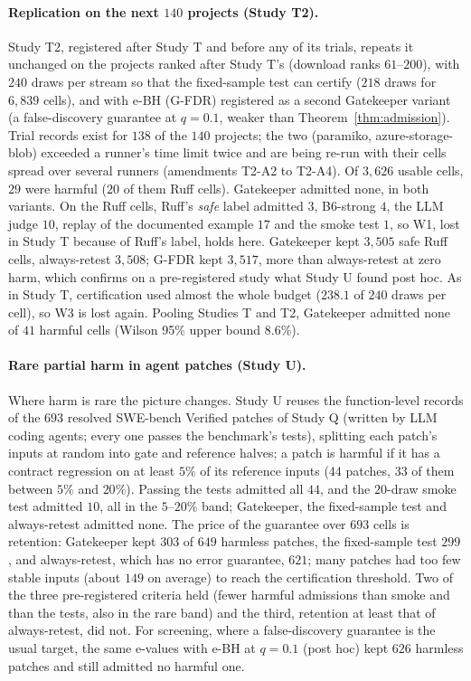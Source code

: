 \paragraph{Replication on the next $140$ projects (Study T2).}
Study T2, registered after Study T and before any of its trials, repeats it unchanged on the projects ranked after Study T's
(download ranks $61$--$200$), with $240$ draws per stream so that the fixed-sample test can certify ($218$ draws for $6{,}839$
cells), and with e-BH (G-FDR) registered as a second Gatekeeper variant (a false-discovery guarantee at $q=0.1$, weaker than Theorem~\ref{thm:admission}).  Trial records exist for $138$ of the $140$ projects; the
two (paramiko, azure-storage-blob) exceeded a runner's time limit twice and are being re-run with their cells spread over several runners (amendments T2-A2 to T2-A4).  Of
$3{,}626$ usable cells, $29$ were harmful ($20$ of them Ruff cells). Gatekeeper admitted none, in both variants.  On the Ruff cells,
Ruff's \emph{safe} label admitted $3$, B6-strong $4$, the LLM judge $10$, replay of the documented example $17$ and the smoke test
$1$, so W1, lost in Study T because of Ruff's label, holds here.  Gatekeeper kept $3{,}505$ safe Ruff cells, always-retest $3{,}508$; G-FDR kept $3{,}517$, more than always-retest at zero harm, which confirms on a pre-registered study what Study U found post hoc.
As in Study T, certification used almost the whole budget ($238.1$ of $240$ draws per cell), so W3 is lost again.
Pooling Studies T and T2, Gatekeeper admitted none of $41$ harmful cells (Wilson 95\% upper bound $8.6\%$).

\paragraph{Rare partial harm in agent patches (Study U).}
Where harm is rare the picture changes.  Study U reuses the function-level records of the $693$ resolved SWE-bench Verified
patches of Study Q (written by LLM coding agents; every one passes the benchmark's tests), splitting each patch's inputs at random
into gate and reference halves; a patch is harmful if it has a contract regression on at least $5\%$ of its reference inputs
($44$ patches, $33$ of them between $5\%$ and $20\%$).  Passing the tests admitted all $44$, and the $20$-draw smoke test admitted $10$, all
in the $5$--$20\%$ band; Gatekeeper, the fixed-sample test and always-retest admitted none.  The price of the guarantee over $693$
cells is retention: Gatekeeper kept $303$ of $649$ harmless patches, the fixed-sample test $299$, and always-retest, which has no error
guarantee, $621$; many patches had too few stable inputs (about $149$ on average) to reach the certification threshold.  Two of the
three pre-registered criteria held (fewer harmful admissions than smoke and than the tests, also in the rare band) and the third,
retention at least that of always-retest, did not.  For screening, where a false-discovery guarantee is the usual target, the same
e-values with e-BH at $q=0.1$ (post hoc) kept $626$ harmless patches and still admitted no harmful one.

